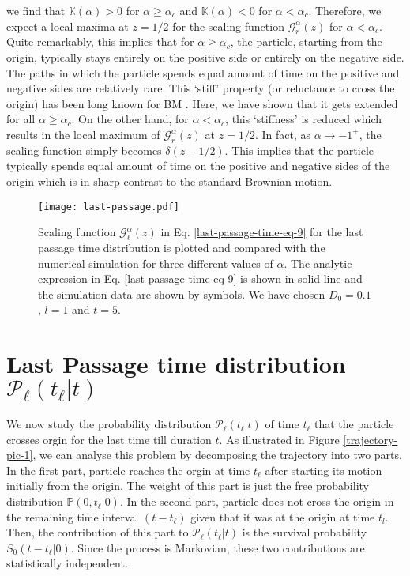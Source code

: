 \documentclass[showpacs,amsmath,amssymb,aps,pre,twocolumn,]{revtex4-1}
\def\bluew#1{{\color{black} #1}}
\begin{document}
we find that $\mathbb{K}(\alpha) >0$ for $\alpha \geq \alpha _c$ and $\mathbb{K}(\alpha) <0$ for $\alpha < \alpha _c$. Therefore, we expect a local maxima at $z=1/2$ for the scaling function $\mathcal{G} _{r}^{\alpha}(z) $ for $\alpha < \alpha _c$. Quite remarkably, this implies that for $\alpha \geq \alpha _c$, the particle, starting from the origin, typically stays entirely on the positive side or entirely on the negative side. The paths in which the particle spends equal amount of time on the positive and negative sides are relatively rare. This `stiff' property (or reluctance to cross the origin) has been long known for BM \bluew{\cite{Majumdar005}}. Here, we have shown that it gets extended for all $\alpha \geq \alpha _c$. On the other hand, for $\alpha < \alpha _c$, this `stiffness' is reduced which results in the local maximum of $\mathcal{G} _{r}^{\alpha}(z) $ at $z=1/2$. In fact, as $\alpha \to -1^+$, the scaling function simply becomes $\delta \left( z-1/2 \right)$. This implies that the particle typically spends equal amount of time on the positive and negative sides of the origin which is in sharp contrast to the standard Brownian motion.
\begin{figure}[t]
\texttt{[image: last-passage.pdf]}
\centering
\caption{Scaling function $\mathcal{G}_{\ell }^{\alpha}(z)$ in Eq. \eqref{last-passage-time-eq-9} for the last passage time distribution is plotted and compared with the numerical simulation for three different values of $\alpha$. The analytic expression in Eq. \eqref{last-passage-time-eq-9} is shown in solid line and the simulation data are shown by symbols. We have chosen $D_0=0.1$, $l=1$ and $t=5$. }
\label{last-passage-fig}
\end{figure}

\section{Last Passage time distribution $\mathcal{P}_{ \ell } \left( t_{\ell}|t \right)$}
\label{last-passage-time}
We now study the probability distribution $\mathcal{P}_{ \ell } \left( t_{\ell}|t \right)$ of time $t_{\ell}$ that the particle crosses orgin for the last time till duration $t$. As illustrated in Figure \ref{trajectory-pic-1}, we can analyse this problem by decomposing the trajectory into two parts. In the first part, particle reaches the orgin at time $t_{\ell}$ after starting its motion initially from the origin. The weight of this part is just the free probability distribution  $\mathbb{P}(0, t_{\ell}|0)$. In the second part, particle does not cross the origin in the remaining time interval $(t-t_{\ell})$ given that it was at the origin at time $t_l$. Then, the contribution of this part to $\mathcal{P}_{ \ell } \left( t_{\ell}|t \right)$ is the survival probability $S_0(t-t_{\ell}|0)$. Since the process is Markovian, these two contributions are statistically independent.
\end{document}
